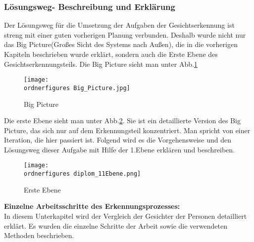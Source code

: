 \subsubsection{Lösungsweg- Beschreibung und Erklärung}
Der Lösungsweg für die Umsetzung der Aufgaben der Gesichtserkennung ist streng mit einer guten vorherigen Planung verbunden. Deshalb wurde nicht nur das Big Picture(Großes Sicht des Systems nach Außen), die in die vorherigen Kapiteln beschrieben wurde erklärt, sondern auch die Erste Ebene des Gesichtserkennungsteils.
Die Big Picture sieht man unter Abb.\ref{fig:Big Picture}
\begin{figure}[H]
	\texttt{[image: \\ordnerfigures Big\_Picture.jpg]}
	\caption{Big Picture}
	\label{fig:Big Picture}
\end{figure}	
Die erste Ebene sieht man unter Abb.\ref{fig:Erste Ebene}. Sie ist ein detaillierte Version des Big Picture, das sich nur auf dem Erkennungsteil konzentriert. Man spricht von einer Iteration, die hier passiert ist.  Folgend wird es die Vorgehensweise und den Lösungsweg dieser Aufgabe mit Hilfe der 1.Ebene erklären und beschreiben.\\

\begin{figure}[H]
	\texttt{[image: \\ordnerfigures diplom\_11Ebene.png]}
	\caption{Erste Ebene}
	\label{fig:Erste Ebene}
\end{figure}

\textbf{Einzelne Arbeitsschritte des Erkennungsprozesses: }\\

In diesem Unterkapitel wird der Vergleich der Gesichter der Personen detailliert erklärt. Es wurden die einzelne Schritte der Arbeit sowie die verwendeten Methoden beschrieben.

